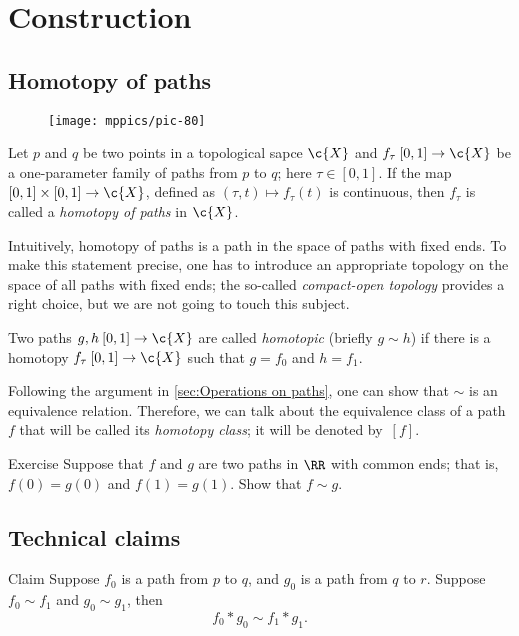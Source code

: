 \chapter{Construction}

\section{Homotopy of paths}


\begin{wrapfigure}{r}{33 mm}
\vskip-4mm
\centering
\texttt{[image: mppics/pic-80]}
\end{wrapfigure}

Let $p$ and $q$ be two points in a topological sapce $\c{X}$ and
 $f_\tau\:[0,1]\to \c{X}$ be a one-parameter family of paths from $p$ to $q$; here $\tau\in [0,1]$.
If the map $[0,1]\times [0,1]\to \c{X}$, defined as $(\tau,t)\mapsto f_\tau(t)$ is continuous, then $f_\tau$ is called a \emph{homotopy of paths} in $\c{X}$.

Intuitively, homotopy of paths is a path in the space of paths with fixed ends.
To make this statement precise, one has to introduce an appropriate topology on the space of all paths with fixed ends; the so-called \emph{compact-open topology} provides a right choice, but we are not going to touch this subject. 

Two paths $g,h\:[0,1]\to \c{X}$ are called {}\emph{homotopic} (briefly $g\sim h$)
if there is a homotopy $f_\tau\:[0,1]\to \c{X}$ such that $g=f_0$ and $h=f_1$.

Following the argument in \ref{sec:Operations on paths}, one can show that $\sim$ is an equivalence relation.
Therefore, we can talk about the equivalence class of a path $f$ that will be called its \emph{homotopy class};
it will be denoted by~$[f]$.

\begin{thm}{Exercise}
Suppose that $f$ and $g$ are two paths in $\RR$ with common ends;
that is, $f(0)=g(0)$ and $f(1)=g(1)$.
Show that $f\sim g$.
\end{thm}




\section{Technical claims}\label{sec:homotopy-claim}

\begin{thm}{Claim}\label{clm:product}
Suppose $f_0$ is a path from $p$ to $q$,
and 
$g_0$ is a path from $q$ to $r$.
Suppose $f_0\sim f_1$ and $g_0\sim g_1$,
then
\[f_0*g_0\sim f_1*g_1.\]
\end{thm}

